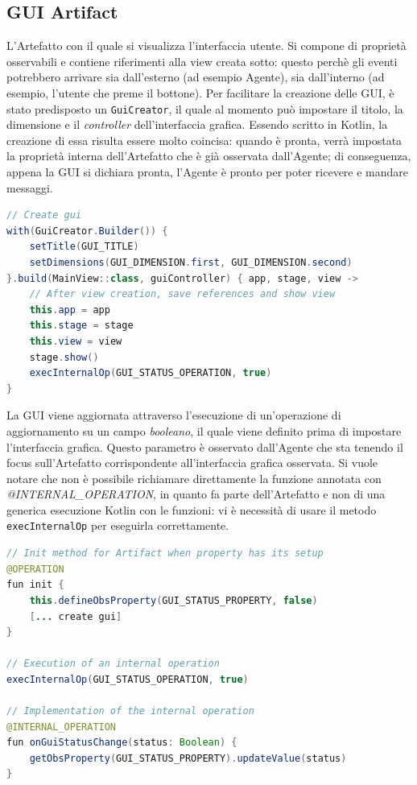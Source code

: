 \documentclass[12pt,a4paper,openright,oneside]{report}
\begin{document}
\subsection{GUI Artifact}
\label{sec:gui}
L'Artefatto con il quale si visualizza l'interfaccia utente. Si compone di proprietà osservabili e contiene riferimenti alla view creata sotto: questo perchè gli eventi potrebbero arrivare sia dall'esterno (ad esempio Agente), sia dall'interno (ad esempio, l'utente che preme il bottone). Per facilitare la creazione delle GUI, è stato predisposto un \texttt{GuiCreator}, il quale al momento può impostare il titolo, la dimensione e il \textit{controller} dell'interfaccia grafica. Essendo scritto in Kotlin, la creazione di essa risulta essere molto coincisa: quando è pronta, verrà impostata la proprietà interna dell'Artefatto che è già osservata dall'Agente; di conseguenza, appena la GUI si dichiara pronta, l'Agente è pronto per poter ricevere e mandare messaggi.

\begin{lstlisting}[language=Java]
// Create gui
with(GuiCreator.Builder()) {
	setTitle(GUI_TITLE)
	setDimensions(GUI_DIMENSION.first, GUI_DIMENSION.second)
}.build(MainView::class, guiController) { app, stage, view ->
	// After view creation, save references and show view
	this.app = app
	this.stage = stage
	this.view = view
	stage.show()
	execInternalOp(GUI_STATUS_OPERATION, true)
}
\end{lstlisting}

La GUI viene aggiornata attraverso l'esecuzione di un'operazione di aggiornamento su un campo \textit{booleano}, il quale viene definito prima di impostare l'interfaccia grafica. Questo parametro è osservato dall'Agente che sta tenendo il focus sull'Artefatto corrispondente all'interfaccia grafica osservata. Si vuole notare che non è possibile richiamare direttamente la funzione annotata con \textit{@INTERNAL\_OPERATION}, in quanto fa parte dell'Artefatto e non di una generica esecuzione Kotlin con le funzioni: vi è necessità di usare il metodo \texttt{execInternalOp} per eseguirla correttamente.

\begin{lstlisting}[language=Java]
// Init method for Artifact when property has its setup
@OPERATION
fun init {
	this.defineObsProperty(GUI_STATUS_PROPERTY, false)
	[... create gui]
}

// Execution of an internal operation
execInternalOp(GUI_STATUS_OPERATION, true)

// Implementation of the internal operation
@INTERNAL_OPERATION
fun onGuiStatusChange(status: Boolean) {
	getObsProperty(GUI_STATUS_PROPERTY).updateValue(status)
}
\end{lstlisting}
\end{document}
